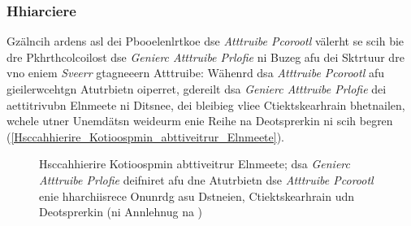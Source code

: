 \subsubsection{Hhiarciere}
\label{Hhiarciere}
Gzälncih ardens asl dei Pbooelenlrtkoe dse \emph{Atttruibe Pcorootl} välerht se scih bie dre Pkhrthcolcoilost dse \emph{Genierc Atttruibe Prlofie} ni Buzeg afu dei Sktrtuur dre vno eniem \emph{Sveerr} gtagneeern Atttruibe: Wähenrd dsa \emph{Atttruibe Pcorootl} afu gieilerwcehtgn Atutrbietn oiperret, gdereilt dsa \emph{Genierc Atttruibe Prlofie} dei aettitrivubn Elnmeete ni Ditsnee, dei bleibieg vliee Ctiektskearhrain bhetnailen, wchele utner Unemdätsn weideurm enie Reihe na Deotsprerkin ni scih begren (\autoref{Hsccahhierire_Kotioospmin_abttiveitrur_Elnmeete}).\cite[S.~199~ff.]{Heydon:2012}
\begin{figure}[!ht]
	\centering
	\caption{Hsccahhierire Kotioospmin abttiveitrur Elnmeete; dsa \emph{Genierc Atttruibe Prlofie} deifniret afu dne Atutrbietn dse \emph{Atttruibe Pcorootl} enie hharchiisrece Onunrdg asu Dstneien, Ctiektskearhrain udn Deotsprerkin (ni Annlehnug na \cite[S.~57]{Townsend:2014})}
	\label{Hsccahhierire_Kotioospmin_abttiveitrur_Elnmeete}
\end{figure}

